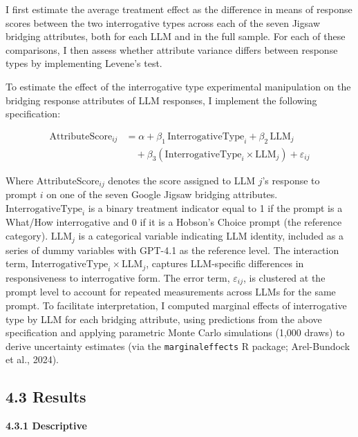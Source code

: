 \documentclass[
  12pt,
]{article}
\begin{document}
I first estimate the average treatment effect as the difference in means of response scores between the two interrogative types across each of the seven Jigsaw bridging attributes, both for each LLM and in the full sample. For each of these comparisons, I then assess whether attribute variance differs between response types by implementing Levene's test.

To estimate the effect of the interrogative type experimental manipulation on the bridging response attributes of LLM responses, I implement the following specification:

\[
\begin{aligned}
\text{AttributeScore}_{ij} &= \alpha
+ \beta_{1} \, \text{InterrogativeType}_{i}
+ \beta_{2} \, \text{LLM}_{j} \\
&\quad + \beta_{3} \left( \text{InterrogativeType}_{i} \times \text{LLM}_{j} \right)
+ \varepsilon_{ij}
\end{aligned}
\]

Where \(\text{AttributeScore}_{ij}\) denotes the score assigned to LLM \(j\)'s response to prompt \(i\) on one of the seven Google Jigsaw bridging attributes. \(\text{InterrogativeType}_{i}\) is a binary treatment indicator equal to 1 if the prompt is a What/How interrogative and 0 if it is a Hobson's Choice prompt (the reference category). \(\text{LLM}_{j}\) is a categorical variable indicating LLM identity, included as a series of dummy variables with GPT-4.1 as the reference level. The interaction term, \(\text{InterrogativeType}_{i}\times\text{LLM}_{j}\), captures LLM-specific differences in responsiveness to interrogative form. The error term, \(\varepsilon_{ij}\), is clustered at the prompt level to account for repeated measurements across LLMs for the same prompt. To facilitate interpretation, I computed marginal effects of interrogative type by LLM for each bridging attribute, using predictions from the above specification and applying parametric Monte Carlo simulations (1,000 draws) to derive uncertainty estimates (via the \texttt{marginaleffects} R package; Arel-Bundock et al., 2024).

\subsection{4.3 Results}\label{results-2}

\textbf{4.3.1 Descriptive}
\end{document}
